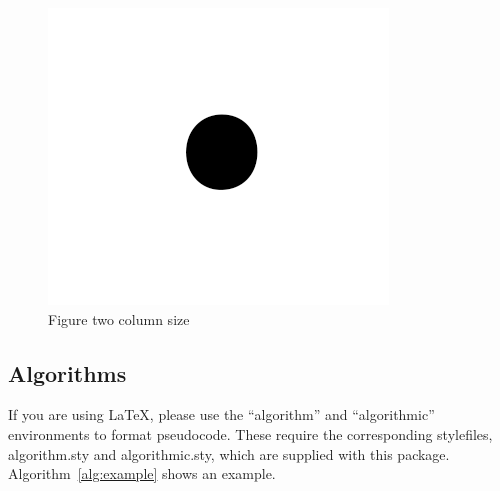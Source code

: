 \begin{figure}
\begin{center}
    \includegraphics[width=\textwidth]{static/figs/fig1.png}
    \caption{Figure two column size}
\label{fig:two_column}
\end{center}
\end{figure}
%
%
%
%
%
\begin{table}[htbp]
\centering
{}
\caption{Hello}
\label{sec:introduction:table}
\end{table}

\subsection{Algorithms}

If you are using \LaTeX, please use the ``algorithm'' and ``algorithmic''
environments to format pseudocode. These require
the corresponding stylefiles, algorithm.sty and
algorithmic.sty, which are supplied with this package.
Algorithm~\ref{alg:example} shows an example.

